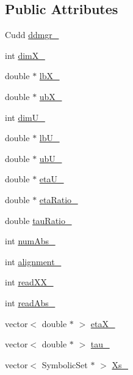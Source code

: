 \subsection*{Public Attributes}
\begin{DoxyCompactItemize}
\item 
Cudd \hyperlink{classscots_1_1Adaptive_a4d986f797368f4e1f74dd7d8a37df2dd}{ddmgr\+\_\+}
\item 
int \hyperlink{classscots_1_1Adaptive_a852e87d359ae3c0fe13493bac80f35f6}{dim\+X\+\_\+}
\item 
double $\ast$ \hyperlink{classscots_1_1Adaptive_a6018fcd45bd81cc0073f0bd1f375829d}{lb\+X\+\_\+}
\item 
double $\ast$ \hyperlink{classscots_1_1Adaptive_ac50c58c4495d727acdb321a0b995426b}{ub\+X\+\_\+}
\item 
int \hyperlink{classscots_1_1Adaptive_ac26b29e9c729fd641af851f87e2ee2b4}{dim\+U\+\_\+}
\item 
double $\ast$ \hyperlink{classscots_1_1Adaptive_aebaf5b4abaa33f4494491cbe67b42b80}{lb\+U\+\_\+}
\item 
double $\ast$ \hyperlink{classscots_1_1Adaptive_aa5c0bc8b175609073aa1f26ad6a83f1c}{ub\+U\+\_\+}
\item 
double $\ast$ \hyperlink{classscots_1_1Adaptive_acc2e430a31aa9ceb8ab6593a9eb3e91f}{eta\+U\+\_\+}
\item 
double $\ast$ \hyperlink{classscots_1_1Adaptive_af0ae9692bf76a9d38cca670e9535310f}{eta\+Ratio\+\_\+}
\item 
double \hyperlink{classscots_1_1Adaptive_a33592a853774854552908de4762f8f8c}{tau\+Ratio\+\_\+}
\item 
int \hyperlink{classscots_1_1Adaptive_afdd5a499494efeb8538346ad9e0f329c}{num\+Abs\+\_\+}
\item 
int \hyperlink{classscots_1_1Adaptive_ad4f525a5a65b284da14369a54532cf39}{alignment\+\_\+}
\item 
int \hyperlink{classscots_1_1Adaptive_a95926f102459b6ec3525040c791ff359}{read\+X\+X\+\_\+}
\item 
int \hyperlink{classscots_1_1Adaptive_a8c2a7e89feeb75f0b51fdf9c8d1359e7}{read\+Abs\+\_\+}
\item 
vector$<$ double $\ast$ $>$ \hyperlink{classscots_1_1Adaptive_abe9d5faea4bd01753070599200e224c5}{eta\+X\+\_\+}
\item 
vector$<$ double $\ast$ $>$ \hyperlink{classscots_1_1Adaptive_a2276dbf06b4db12739aed70443c1a32d}{tau\+\_\+}
\item 
vector$<$ Symbolic\+Set $\ast$ $>$ \hyperlink{classscots_1_1Adaptive_ae43471177bc6b7d3229a9497b46ee343}{Xs\+\_\+}

\end{DoxyCompactItemize}
